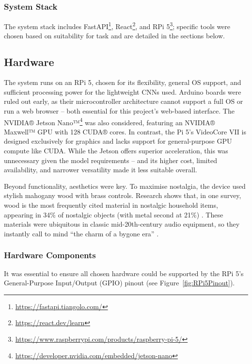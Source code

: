             \subsubsection{System Stack}
    
                The system stack includes FastAPI\footnote{\url{https://fastapi.tiangolo.com/}}, React\footnote{\url{https://react.dev/learn}}, and RPi 5\footnote{\url{https://www.raspberrypi.com/products/raspberry-pi-5/}}; specific tools were chosen based on suitability for task and are detailed in the sections below.
    
    
        \subsection{Hardware}
    
            The system runs on an RPi 5, chosen for its flexibility, general OS support, and sufficient processing power for the lightweight CNNs used. Arduino boards were ruled out early, as their microcontroller architecture cannot support a full OS or run a web browser -- both essential for this project's web-based interface. The NVIDIA® Jetson Nano™\footnote{\url{https://developer.nvidia.com/embedded/jetson-nano}} was also considered, featuring an NVIDIA® Maxwell™ GPU with 128 CUDA® cores. In contrast, the Pi 5's VideoCore VII is designed exclusively for graphics and lacks support for general-purpose GPU compute like CUDA. While the Jetson offers superior acceleration, this was unnecessary given the model requirements -- and its higher cost, limited availability, and narrower versatility made it less suitable overall.
            
            Beyond functionality, aesthetics were key. To maximise nostalgia, the device used stylish mahogany wood with brass controls. Research shows that, in one survey, wood is the most frequently cited material in nostalgic household items, appearing in 34\% of nostalgic objects (with metal second at 21\%) \cite{Skinner2022}. These materials were ubiquitous in classic mid-20th-century audio equipment, so they instantly call to mind ``the charm of a bygone era'' \cite{LookInTheAttic2024}.
    
            \subsubsection{Hardware Components}
    
                It was essential to ensure all chosen hardware could be supported by the RPi 5's General-Purpose Input/Output (GPIO) pinout (see Figure~\ref{fig:RPi5Pinout}).
    
